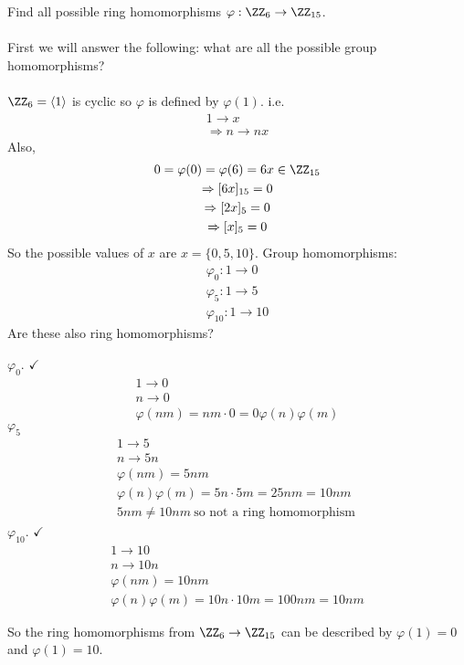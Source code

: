 \documentclass[class=scrartcl, crop=false]{standalone}
\begin{document}
\begin{example}
  Find all possible ring homomorphisms $\varphi: \ZZ_6 \to \ZZ_{15}$. 
  \\\\
  First we will answer the following: what are all the possible group homomorphisms?
  \\\\
  $\ZZ_6 = \langle 1 \rangle $ is cyclic so $\varphi$ is defined by $\varphi(1)$. i.e.
  \begin{gather*}
    1 \to x \\
    \Rightarrow n \to nx
  \end{gather*} 
  Also, 
  \begin{gather*}
    0 = \varphi(0) = \varphi(6) = 6x \in \ZZ_{15} \\
    \Rightarrow [6x]_{15} = 0 \\
    \Rightarrow [2x]_5 = 0 \\
    \Rightarrow [x]_5 = 0
  \end{gather*} 
  So the possible values of $x$ are $x = \{0, 5, 10\}$. Group homomorphisms: 
  \begin{gather*}
    \varphi_0: 1 \to 0 \\
    \varphi_5: 1 \to 5 \\
    \varphi_{10}: 1 \to 10
  \end{gather*} 
  Are these also ring homomorphisms?
  \begin{enumerate}
    \ii $\varphi_0$. $\checkmark$
    \begin{gather*}
      1 \to 0 \\
      n \to 0 \\
      \varphi(nm) = nm \cdot 0 = 0 \varphi(n)\varphi(m)
    \end{gather*} 
      \ii $\varphi_5$ 
      \begin{gather*}
        1 \to 5 \\
        n \to 5n \\
        \varphi(nm) = 5 nm \\
        \varphi(n) \varphi(m) = 5n \cdot 5m = 25 nm = 10nm \\
        5 nm \neq 10 nm \ \text{so not a ring homomorphism} \ 
      \end{gather*} 
      \ii $\varphi_{10}$. $\checkmark$
      \begin{gather*}
        1 \to 10 \\
        n \to 10n \\
        \varphi(nm) = 10nm \\
        \varphi(n) \varphi(m) = 10 n \cdot 10m = 100 nm = 10 nm
      \end{gather*} 
  \end{enumerate} 
  So the ring homomorphisms from $\ZZ_6 \to \ZZ_{15}$ can be described by $\varphi(1) = 0$ and $\varphi(1) = 10$.
\end{example} 
\end{document}
